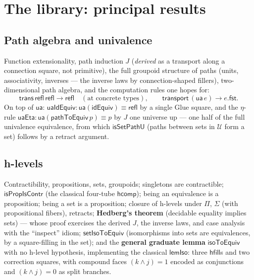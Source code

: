 \documentclass[11pt]{article}
\newcommand{\U}{\mathcal{U}}
\newcommand{\op}[1]{\ensuremath{\mathsf{#1}}}
\begin{document}
\section{The library: principal results}

\subsection{Path algebra and univalence}
Function extensionality, path induction $J$ (\emph{derived} as a
transport along a connection square, not primitive), the full groupoid
structure of paths (units, associativity, inverses --- the inverse laws by
connection-shaped fillers), two-dimensional path algebra, and the
computation rules one hopes for:
\[
\op{trans}\,\op{refl}\,\op{refl} \longrightarrow \op{refl}
\quad(\text{at concrete types}),\qquad
\op{transport}\,(\op{ua}\,e) \longrightarrow e.\op{fst}.
\]
On top of $\op{ua}$: $\op{uaIdEquiv}:\op{ua}(\op{idEquiv})\equiv\op{refl}$
by a single Glue square, and the $\eta$-rule
$\op{uaEta} : \op{ua}(\op{pathToEquiv}\,p)\equiv p$ by $J$ one universe up
--- one half of the full univalence equivalence, from which
$\op{isSetPathU}$ (paths between sets in $\U$ form a set) follows by a
retract argument.

\subsection{h-levels}
Contractibility, propositions, sets, groupoids; singletons are
contractible; $\op{isPropIsContr}$ (the classical four-tube
$\op{hcomp}$); being an equivalence is a proposition; being a set is a
proposition; closure of h-levels under $\Pi$, $\Sigma$ (with
propositional fibers), retracts; \textbf{Hedberg's theorem} (decidable
equality implies sets) --- whose proof exercises the derived $J$, the
inverse laws, and case analysis with the ``inspect'' idiom;
$\op{setIsoToEquiv}$ (isomorphisms into sets are equivalences, by a
square-filling in the set); and the \textbf{general graduate lemma}
$\op{isoToEquiv}$ with no h-level hypothesis, implementing the classical
$\op{lemIso}$: three $\op{hfill}$s and two correction squares, with
compound faces $(k\wedge j){=}1$ encoded as conjunctions and
$(k\wedge j){=}0$ as split branches.
\end{document}
